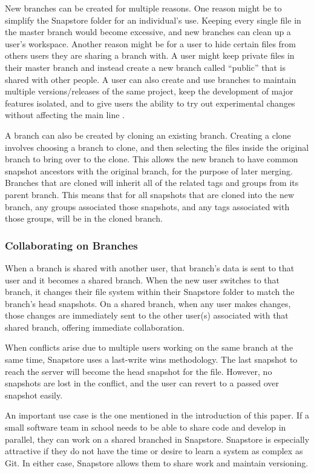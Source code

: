 New branches can be created for multiple reasons. One reason might be to simplify the Snapstore folder for an individual's use. Keeping every single file in the master branch would become excessive, and new branches can clean up a user's workspace. Another reason might be for a user to hide certain files from others users they are sharing a branch with. A user might keep private files in their master branch and instead create a new branch called ``public'' that is shared with other people. A user can also create and use branches to maintain multiple versions/releases of the same project, keep the development of major features isolated, and to give users the ability to try out experimental changes without affecting the main line \cite{Rosso}.

A branch can also be created by cloning an existing branch. Creating a clone involves choosing a branch to clone, and then selecting the files inside the original branch to bring over to the clone. This allows the new branch to have common snapshot ancestors with the original branch, for the purpose of later merging. Branches that are cloned will inherit all of the related tags and groups from its parent branch. This means that for all snapshots that are cloned into the new branch, any groups associated those snapshots, and any tags associated with those groups, will be in the cloned branch.

\subsubsection{Collaborating on Branches}

When a branch is shared with another user, that branch's data is sent to that user and it becomes a shared branch. When the new user switches to that branch, it changes their file system within their Snapstore folder to match the branch's head snapshots. On a shared branch, when any user makes changes, those changes are immediately sent to the other user(s) associated with that shared branch, offering immediate collaboration.

When conflicts arise due to multiple users working on the same branch at the same time, Snapstore uses a last-write wins methodology. The last snapshot to reach the server will become the head snapshot for the file. However, no snapshots are lost in the conflict, and the user can revert to a passed over snapshot easily.

An important use case is the one mentioned in the introduction of this paper. If a small software team in school needs to be able to share code and develop in parallel, they can work on a shared branched in Snapstore. Snapstore is especially attractive if they do not have the time or desire to learn a system as complex as Git. In either case, Snapstore allows them to share work and maintain versioning.

